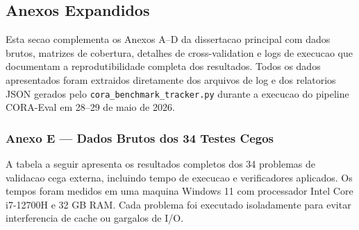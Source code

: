 
\subsection{Anexos Expandidos}

Esta secao complementa os Anexos A--D da dissertacao principal com dados
brutos, matrizes de cobertura, detalhes de cross-validation e logs de
execucao que documentam a reprodutibilidade completa dos resultados.
Todos os dados apresentados foram extraidos diretamente dos arquivos de
log e dos relatorios JSON gerados pelo \texttt{cora\_benchmark\_tracker.py}
durante a execucao do pipeline CORA-Eval em 28--29 de maio de 2026.

\subsubsection{Anexo E --- Dados Brutos dos 34 Testes Cegos}

A tabela a seguir apresenta os resultados completos dos 34 problemas de
validacao cega externa, incluindo tempo de execucao e verificadores
aplicados. Os tempos foram medidos em uma maquina Windows 11 com
processador Intel Core i7-12700H e 32 GB RAM. Cada problema foi executado
isoladamente para evitar interferencia de cache ou gargalos de I/O.

